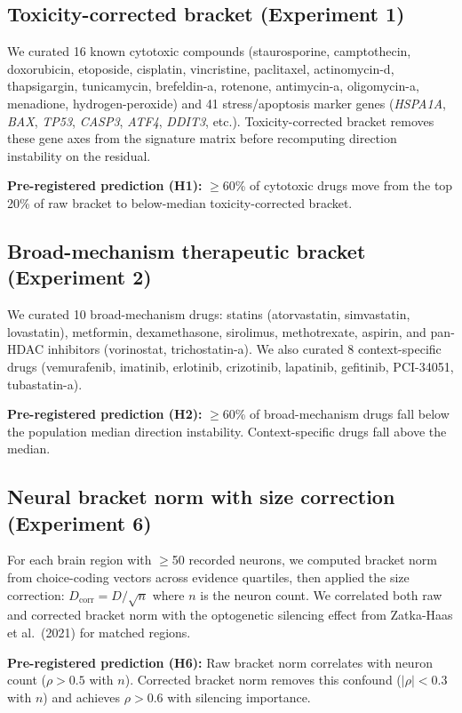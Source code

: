 \documentclass{article}
\begin{document}
\subsection{Toxicity-corrected bracket (Experiment 1)}

We curated 16 known cytotoxic compounds (staurosporine, camptothecin,
doxorubicin, etoposide, cisplatin, vincristine, paclitaxel, actinomycin-d,
thapsigargin, tunicamycin, brefeldin-a, rotenone, antimycin-a, oligomycin-a,
menadione, hydrogen-peroxide) and 41 stress/apoptosis marker genes
(\emph{HSPA1A}, \emph{BAX}, \emph{TP53}, \emph{CASP3}, \emph{ATF4},
\emph{DDIT3}, etc.). Toxicity-corrected bracket removes these gene axes from
the signature matrix before recomputing direction instability on the residual.

\textbf{Pre-registered prediction (H1):} $\geq$60\% of cytotoxic drugs move
from the top 20\% of raw bracket to below-median toxicity-corrected bracket.

\subsection{Broad-mechanism therapeutic bracket (Experiment 2)}

We curated 10 broad-mechanism drugs: statins (atorvastatin, simvastatin,
lovastatin), metformin, dexamethasone, sirolimus, methotrexate, aspirin,
and pan-HDAC inhibitors (vorinostat, trichostatin-a). We also curated 8
context-specific drugs (vemurafenib, imatinib, erlotinib, crizotinib,
lapatinib, gefitinib, PCI-34051, tubastatin-a).

\textbf{Pre-registered prediction (H2):} $\geq$60\% of broad-mechanism drugs
fall below the population median direction instability. Context-specific
drugs fall above the median.

\subsection{Neural bracket norm with size correction (Experiment 6)}

For each brain region with $\geq$50 recorded neurons, we computed bracket norm
from choice-coding vectors across evidence quartiles, then applied the
size correction: $D_{\text{corr}} = D / \sqrt{n}$ where $n$ is the neuron
count. We correlated both raw and corrected bracket norm with the optogenetic
silencing effect from Zatka-Haas et al.\ (2021) for matched regions.

\textbf{Pre-registered prediction (H6):} Raw bracket norm correlates with
neuron count ($\rho > 0.5$ with $n$). Corrected bracket norm removes this
confound ($|\rho| < 0.3$ with $n$) and achieves $\rho > 0.6$ with silencing
importance.
\end{document}
